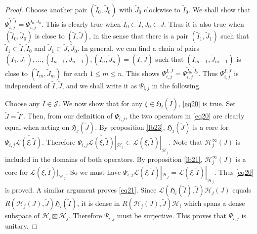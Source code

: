 \documentclass[11pt,b5paper,notitlepage]{article}
\theoremstyle{definition}
\theoremstyle{plain}
\newcommand{\fk}{\mathfrak}
\newcommand{\mc}{\mathcal}
\newcommand{\wtd}{\widetilde}
\newcommand{\ovl}{\overline}
\newcommand{\scr}{\mathscr}
\newcommand{\Jtd}{\widetilde{\mathcal J}}
\numberwithin{equation}{subsection}
\begin{document}
\begin{proof}
Choose another pair $(\wtd I_0,\wtd J_0)$ with $\wtd J_0$ clockwise to $\wtd I_0$. We shall show that $\Psi_{i,j}^{\wtd I,\wtd J}=\Psi_{i,j}^{\wtd I_0,\wtd J_0}$. This is clearly true when $\wtd I_0\subset\wtd I,\wtd J_0\subset\wtd J$. Thus it is also true when $(\wtd I_0,\wtd J_0)$ is close to $(\wtd I,\wtd J)$, in the sense that there is a pair $(\wtd I_1,\wtd J_1)$ such that $\wtd I_1\subset \wtd I,\wtd I_0$ and $\wtd J_1\subset\wtd J,\wtd J_0$. In general, we can find a chain of pairs $(\wtd I_1,\wtd J_1),\dots,(\wtd I_{n-1},\wtd J_{n-1}),(\wtd I_n,\wtd J_n)=(\wtd I,\wtd J)$ such that $(\wtd I_{m-1},\wtd J_{m-1})$ is close to $(\wtd I_m,\wtd J_m)$ for each $1\leq m\leq n$. This shows $\Psi_{i,j}^{\wtd I,\wtd J}=\Psi_{i,j}^{\wtd I_0,\wtd J_0}$. Thus $\Psi_{i,j}^{\wtd I,\wtd J}$ is independent of $\wtd I,\wtd J$, and we shall write it as $\Psi_{i,j}$ in the following.

Choose any $\wtd I\in\Jtd$. We now show that for any $\xi\in\fk H_i(\wtd I)$, \eqref{eq20} is true. Set $\wtd J=\wtd I'$. Then, from our definition of $\Psi_{i,j}$, the  two operators in \eqref{eq20} are clearly equal when acting on $\fk H_j(\wtd J)$. By proposition \ref{lb23}, $\fk H_j(\wtd J)$ is a core for $\Psi_{i,j}\ovl{\mc L(\xi,\wtd I)}$. Therefore $\Psi_{i,j}\ovl{\mc L(\xi,\wtd I)}|_{\mc H_j}\subset \scr L(\xi,\wtd I)|_{\mc H_j}$. Note that $\mc H_j^\infty(J)$ is included in the domains of both operators. By proposition \ref{lb21}, $\mc H_j^\infty(J)$ is a core for $\scr L(\xi,\wtd I)|_{\mc H_j}$. So we must have $\Psi_{i,j}\ovl{\mc L(\xi,\wtd I)}|_{\mc H_j}= \scr L(\xi,\wtd I)|_{\mc H_j}$.   Thus  \eqref{eq20} is proved. A similar argument proves \eqref{eq21}. Since $\scr L(\fk H_i(\wtd I),\wtd I)\mc H_j(J)$ equals $R(\mc H_j(J),\wtd J)\fk H_i(\wtd I)$, it is dense in $R(\mc H_j(J),\wtd J)\mc H_i$ which spans a dense subspace of $\mc H_i\boxtimes\mc H_j$. Therefore $\Psi_{i,j}$ must be surjective. This proves that $\Psi_{i,j}$ is unitary.


\end{proof}
\end{document}
